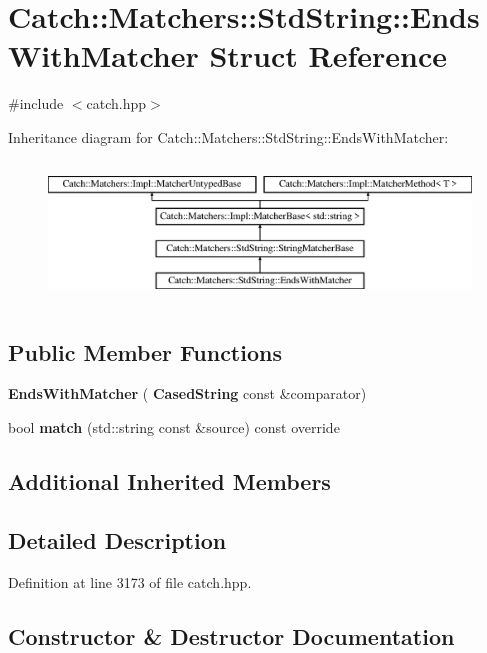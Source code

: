 \section{Catch\+::Matchers\+::Std\+String\+::Ends\+With\+Matcher Struct Reference}
\label{struct_catch_1_1_matchers_1_1_std_string_1_1_ends_with_matcher}


{\ttfamily \#include $<$catch.\+hpp$>$}

Inheritance diagram for Catch\+::Matchers\+::Std\+String\+::Ends\+With\+Matcher\+:\begin{figure}[H]
\begin{center}
\leavevmode
\includegraphics[height=3.758389cm]{struct_catch_1_1_matchers_1_1_std_string_1_1_ends_with_matcher}
\end{center}
\end{figure}
\subsection*{Public Member Functions}
\begin{DoxyCompactItemize}
\item 
\textbf{ Ends\+With\+Matcher} (\textbf{ Cased\+String} const \&comparator)
\item 
bool \textbf{ match} (std\+::string const \&source) const override
\end{DoxyCompactItemize}
\subsection*{Additional Inherited Members}


\subsection{Detailed Description}


Definition at line 3173 of file catch.\+hpp.



\subsection{Constructor \& Destructor Documentation}
\mbox{\label{struct_catch_1_1_matchers_1_1_std_string_1_1_ends_with_matcher_aa5ec700b4629562f74f362080accfd7b}} 
